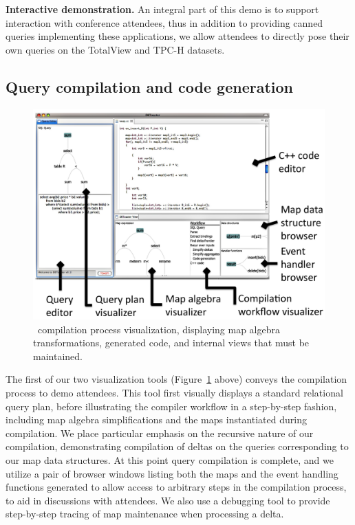 \smallskip
\noindent\textbf{Interactive demonstration.}
An integral part of this demo is to support interaction with conference
attendees, thus in addition to providing canned queries implementing these
applications, we allow attendees to directly pose their own queries on
the TotalView and TPC-H datasets.



\subsection{Query compilation and code generation}

\begin{figure}[tb]
\begin{center}
\includegraphics[scale=0.088]{figures/dbt-gui}
\end{center}

\vspace{-4mm}

\caption{\compiler\ compilation process visualization, displaying map algebra
transformations, generated code, and internal views that must be maintained.}
\label{fig:compilegui}
\end{figure}

The first of our two visualization tools (Figure~\ref{fig:compilegui} above)
conveys the compilation process to demo attendees. This tool first visually
displays a standard relational query plan, before illustrating the compiler
workflow in a step-by-step fashion, including map algebra simplifications and the
maps instantiated during compilation. We place particular emphasis on the
recursive nature of our compilation, demonstrating compilation of deltas on the
queries corresponding to our map data structures. At this point query compilation
is complete, and we utilize a pair of browser windows listing both the maps and
the event handling functions generated to allow access to arbitrary steps in the
compilation process, to aid in discussions with attendees. We also use a
debugging tool to provide step-by-step tracing of map maintenance when
processing a delta.

